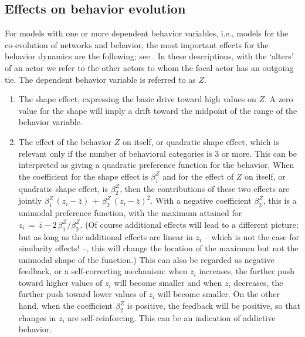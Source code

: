 \documentclass[a4paper,fleqn]{article}
\newcommand{\+}{\, + \,}
\begin{document}
{\begin{enumerate}
\end{enumerate}


\subsection{Effects on behavior evolution}
\label{S_eff_beh}

For models with one or more dependent behavior variables, i.e.,
models for the co-evolution of networks and behavior,
the most important effects for the behavior dynamics are the following;
see \citet*{SteglichEA10}.
In these descriptions, with the `alters' of an actor
we refer to the other actors to whom
the focal actor has an outgoing tie.
The dependent behavior variable is referred to as $Z$.
\begin{enumerate}
\item The shape effect, expressing the basic drive toward high values on $Z$.
      A zero value for the shape will imply a drift toward the midpoint
      of the range of the behavior variable.
\item The effect of the behavior $Z$ on itself,
      or quadratic shape effect, which is relevant
      only if the number of behavioral categories is 3 or more.
      This can be interpreted as giving a quadratic preference function
      for the behavior.
      When the coefficient for the shape effect is $\beta^Z_1$ and for the
      effect of $Z$ on itself, or quadratic shape effect, is $\beta^Z_2$,
      then the contributions
      of these two effects are jointly $\beta^Z_1\, (z_i - \bar z) \,+\,
                   \beta^Z_2\, (z_i - \bar z)^2$.
      With a negative coefficient $\beta^Z_2$, this
      is a unimodal preference function, with the maximum attained
      for $z_i \,=\, \bar z - 2\,\beta^Z_1/\beta^Z_2$.
      (Of course additional effects will lead to a different picture;
      but as long as the additional effects are linear in $z_i$ -- which is not
      the case for similarity effects! --, this will change the location of the maximum
      but not the unimodal shape of the function.)
      This can also be regarded as negative feedback, or a self-correcting
      mechanism: when $z_i$ increases, the further push toward higher values
      of $z_i$ will become smaller and when $z_i$ decreases, the further push toward lower values
      of $z_i$ will become smaller. On the other hand, when the coefficient $\beta^Z_2$
      is positive, the feedback will be positive, so that changes in $z_i$
      are self-reinforcing. This can be an indication of addictive behavior.

\end{enumerate}}
\end{document}
